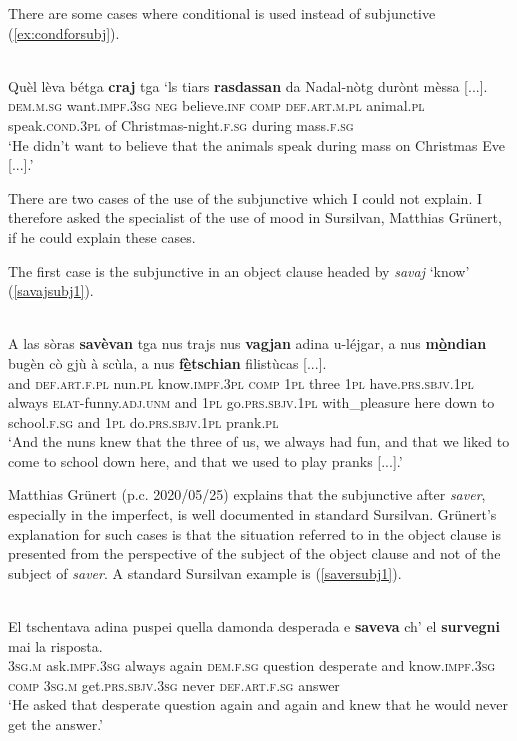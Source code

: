 There are some cases where conditional is used instead of subjunctive (\ref{ex:condforsubj}).


\ea
\label{ex:condforsubj}
 {\citealt[132]{Büchli1966}}\\
\gll Quèl lèva bétga \textbf{craj} tga `ls tiars \textbf{rasdassan} da Nadal-nòtg durònt mèssa [...].\\
\textsc{dem.m.sg} want.\textsc{impf.3sg} \textsc{neg} believe.\textsc{inf} \textsc{comp} \textsc{def.art.m.pl} animal.\textsc{pl} speak.\textsc{cond.3pl} of Christmas-night.\textsc{f.sg} during mass.\textsc{f.sg}\\
\glt `He didn't want to believe that the animals speak during mass on Christmas Eve [...].'
\z

There are two cases of the use of the subjunctive which I could not explain. I therefore asked the specialist of the use of mood in Sursilvan, Matthias Grünert, if he could explain these cases.

The first case is the subjunctive in an object clause headed by \textit{savaj} `know' (\ref{savajsubj1}).

\ea
\label{savajsubj1}
\\
\gll    A las sòras \textbf{savèvan} tga nus trajs nus \textbf{vagjan} adina u-léjgar, a nus \textbf{m\underline{ò}ndian} bugèn cò gjù à scùla, a nus \textbf{f\underline{è}tschian} filistùcas [...].\\
and \textsc{def.art.f.pl} nun.\textsc{pl} know.\textsc{impf.3pl} \textsc{comp} \textsc{1pl} three \textsc{1pl} have.\textsc{prs.sbjv.1pl} always \textsc{elat}-funny.\textsc{adj.unm} and \textsc{1pl} go.\textsc{prs.sbjv.1pl} with\_pleasure here down to school.\textsc{f.sg} and \textsc{1pl} do.\textsc{prs.sbjv.1pl} prank.\textsc{pl}\\
\glt `And the nuns knew that the three of us, we always had fun, and that we liked to come to school down here, and that we used to play pranks [...].'
\z

Matthias Grünert (p.c. 2020/05/25) explains that the subjunctive after \textit{saver}, especially in the imperfect, is well documented in standard Sursilvan. Grünert's explanation for such cases is that the situation referred to in the object clause is presented from the perspective of the subject of the object clause and not of the subject of \textit{saver}. A standard Sursilvan example is (\ref{saversubj1}).

\ea
\label{saversubj1}
 {\citealt[439]{Grünert2003}}\\
\gll El tschentava adina puspei quella damonda desperada e \textbf{saveva} ch’ el \textbf{survegni} mai la risposta.\\
\textsc{3sg.m} ask.\textsc{impf.3sg} always again \textsc{dem.f.sg} question desperate and know.\textsc{impf.3sg} \textsc{comp} \textsc{3sg.m} get.\textsc{prs.sbjv.3sg} never \textsc{def.art.f.sg} answer\\
\glt `He asked that desperate question again and again and knew that he would never get the answer.'
\z

